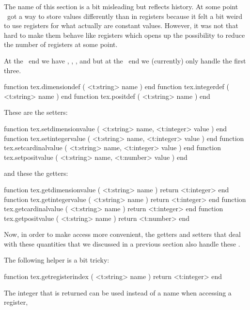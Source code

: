 \stopsubsection

\startsubsection[title=Constants]

The name of this section is a bit misleading but reflects history. At some point
\LUAMETATEX\ got a way to store values differently than in registers because it
felt a bit weird to use registers for what actually are constant values. However,
it was not that hard to make them behave like registers which opens up the
possibility to reduce the number of registers at some point.

At the \TEX\ end we have \type {\integerdef}, \type {\dimensiondef}, \type
{\floatdef}, \type {\gluespecdef} and \type {\mugluespecdef} but at the \LUA\ end
we (currently) only handle the first three.

\starttyping[option=LUA]
function tex.dimensiondef ( <t:string> name ) end
function tex.integerdef   ( <t:string> name ) end
function tex.positdef     ( <t:string> name ) end
\stoptyping

These are the setters:

\starttyping[option=LUA]
function tex.setdimensionvalue ( <t:string> name, <t:integer> value ) end
function tex.setintegervalue   ( <t:string> name, <t:integer> value ) end
function tex.setcardinalvalue  ( <t:string> name, <t:integer> value ) end
function tex.setpositvalue     ( <t:string> name, <t:number>  value ) end
\stoptyping

and these the getters:

\starttyping[option=LUA]
function tex.getdimensionvalue ( <t:string> name ) return <t:integer> end
function tex.getintegervalue   ( <t:string> name ) return <t:integer> end
function tex.getcardinalvalue  ( <t:string> name ) return <t:integer> end
function tex.getpositvalue     ( <t:string> name ) return <t:number>  end
\stoptyping

Now, in order to make access more convenient, the getters and setters that deal
with these quantities that we discussed in a previous section also handle these
.

The following helper is a bit tricky:

\starttyping[option=LUA]
function tex.getregisterindex ( <t:string> name )
    return <t:integer>
end
\stoptyping

The integer that is returned can be used instead of a name when accessing a register,

\startbuffer
\newcount \MyCount  \newinteger   \MyInteger
\newdimen \MyDimen  \newdimension \MyDimension

